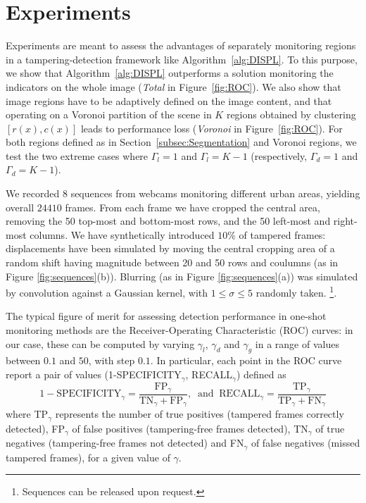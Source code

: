 \documentclass{llncs}
\newcommand{\gi}[1]{{\textcolor{red}{[\small \textbf{Giacomo}: #1]}}}
\begin{document}
\section{Experiments}\label{sec:experiments}
Experiments are meant to assess the advantages of separately monitoring regions in a tampering-detection framework like Algorithm~\ref{alg:DISPL}. To this purpose, we show that Algorithm~\ref{alg:DISPL} outperforms a solution monitoring the indicators on the whole image (\emph{Total} in Figure~\ref{fig:ROC}). We also show that image regions have to be adaptively defined on the image content, and that operating on a Voronoi partition of the scene in $K$ regions obtained by clustering $[r(x), c(x)]$ leads to performance loss (\emph{Voronoi} in Figure~\ref{fig:ROC}). For both regions defined as in Section~\ref{subsec:Segmentation} and Voronoi regions, we test the two extreme cases where $\Gamma_l = 1$ and $\Gamma_l = K-1$ (respectively, $\Gamma_d = 1$ and $\Gamma_d = K-1$).

We recorded $8$ sequences from webcams monitoring different urban areas, yielding overall $24410$ frames. From each frame we have cropped the central area, removing the 50 top-most and bottom-most rows, and the 50 left-most and right-most columns. We have synthetically introduced $10\%$ of tampered frames: displacements have been simulated by moving the central cropping area of a random shift having magnitude between 20 and 50 rows and coulumns (as in Figure \ref{fig:sequences}(b)). Blurring  (as in Figure \ref{fig:sequences}(a)) was simulated by convolution against a Gaussian kernel, with $1\leq\sigma\leq5$ randomly taken. \footnote{Sequences can be released upon request.}.

The typical figure of merit for assessing detection performance in one-shot monitoring methods are the Receiver-Operating Characteristic (ROC) curves: in our case, these can be computed by varying $\gamma_l$, $\gamma_d$ and $\gamma_g$ in a range of values between $0.1$ and $50$, with step $0.1$. In particular, each point in the ROC curve report a pair of values (1-SPECIFICITY$_\gamma$, RECALL$_\gamma$) defined as
\[1-\text{SPECIFICITY}_\gamma = \frac{\text{FP}_\gamma}{\text{TN}_\gamma+\text{FP}_\gamma}, \ \text{ and } \ \text{RECALL}_\gamma=\frac{\text{TP}_\gamma}{\text{TP}_\gamma+\text{FN}_\gamma}\]
where TP$_\gamma$ represents the number of true positives (tampered frames correctly detected), FP$_\gamma$ of false positives (tampering-free frames detected), TN$_\gamma$ of true negatives (tampering-free frames not detected) and FN$_\gamma$ of false negatives (missed tampered frames), for a given value of $\gamma$.
\vspace{-0.3cm}
\end{document}
